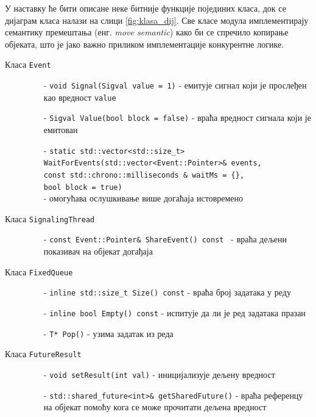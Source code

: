 \documentclass[12pt,oneside]{memoir}
\begin{document}
У наставку ће бити описане неке битније функције појединих класа, док се дијаграм класа налази на слици \ref{fig:klasa_dij}. Све класе модула имплементирају семантику премештања (енг. \textit{move semantic}) како би се спречило копирање објеката, што је јако важно приликом имплементације конкурентне логике. 

\begin{description}
	\item[Класа \texttt{Event}]\leavevmode
		\begin{itemize}
			\item[-] \texttt{void Signal(Sigval value = 1)} - емитује сигнал који је прослеђен као вредност \texttt{value}
			\item[-] \texttt{Sigval Value(bool block = false)} - враћа вредност сигнала који је емитован  
			\item[-] \texttt{static std::vector<std::size\_t>
			\\
			 WaitForEvents(std::vector<Event::Pointer>\& events,
			 \\
			 const std::chrono::milliseconds \& waitMs = \{\}, 
			 \\ 
			 bool block = true)} 
			 \\ - омогућава ослушкивање више догаћаја истовремено
		\end{itemize}			
	\item[Класа \texttt{SignalingThread}]\leavevmode
		\begin{itemize}
			\item[-] \texttt{const Event::Pointer\& ShareEvent() const } - враћа дељени показивач на објекат догађаја 	
		\end{itemize}			
	\item[Класа \texttt{FixedQueue}]\leavevmode
		\begin{itemize}
			\item[-] \texttt{inline std::size\_t Size() const} - враћа број задатака у реду
			\item[-] \texttt{inline bool Empty() const} - испитује да ли је ред задатака 	празан	
			\item[-] \texttt{T* Pop()} - узима задатак из реда 
		\end{itemize}			
	\item[Класа \texttt{FutureResult}]\leavevmode
		\begin{itemize}
			\item[-] \texttt{void setResult(int val)} - иницијализује дељену вредност
			\item[-] \texttt{std::shared\_future<int>\& getSharedFuture()} - враћа референцу на објекат помоћу кога се може прочитати дељена вредност			

\end{itemize}
\end{description}
\end{document}
